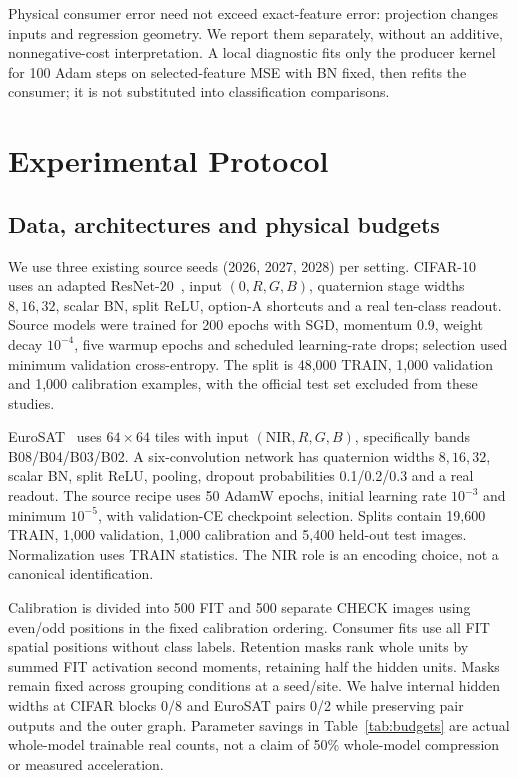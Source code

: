 \documentclass[conference,letterpaper,10pt]{IEEEtran}
\newcommand{\aidraft}{\par\noindent{\footnotesize\textit{AI-assisted drafting}~\cite{OpenAI2026Codex}.}\par}
\begin{document}
Physical consumer error need not exceed exact-feature error: projection changes inputs and regression geometry. We report them separately, without an additive, nonnegative-cost interpretation. A local diagnostic fits only the producer kernel for 100 Adam steps on selected-feature MSE with BN fixed, then refits the consumer; it is not substituted into classification comparisons.

\section{Experimental Protocol}
\aidraft
\subsection{Data, architectures and physical budgets}
We use three existing source seeds (2026, 2027, 2028) per setting. CIFAR-10~\cite{Krizhevsky2009} uses an adapted ResNet-20~\cite{He2016ResNet}, input $(0,R,G,B)$, quaternion stage widths $8,16,32$, scalar BN, split ReLU, option-A shortcuts and a real ten-class readout. Source models were trained for 200 epochs with SGD, momentum 0.9, weight decay $10^{-4}$, five warmup epochs and scheduled learning-rate drops; selection used minimum validation cross-entropy. The split is 48,000 TRAIN, 1,000 validation and 1,000 calibration examples, with the official test set excluded from these studies.

EuroSAT~\cite{Helber2019EuroSAT} uses $64\times64$ tiles with input $(\mathrm{NIR},R,G,B)$, specifically bands B08/B04/B03/B02. A six-convolution network has quaternion widths $8,16,32$, scalar BN, split ReLU, pooling, dropout probabilities 0.1/0.2/0.3 and a real readout. The source recipe uses 50 AdamW epochs, initial learning rate $10^{-3}$ and minimum $10^{-5}$, with validation-CE checkpoint selection. Splits contain 19,600 TRAIN, 1,000 validation, 1,000 calibration and 5,400 held-out test images. Normalization uses TRAIN statistics. The NIR role is an encoding choice, not a canonical identification.

Calibration is divided into 500 FIT and 500 separate CHECK images using even/odd positions in the fixed calibration ordering. Consumer fits use all FIT spatial positions without class labels. Retention masks rank whole units by summed FIT activation second moments, retaining half the hidden units. Masks remain fixed across grouping conditions at a seed/site. We halve internal hidden widths at CIFAR blocks 0/8 and EuroSAT pairs 0/2 while preserving pair outputs and the outer graph. Parameter savings in Table~\ref{tab:budgets} are actual whole-model trainable real counts, not a claim of 50\% whole-model compression or measured acceleration.

\end{document}
